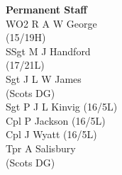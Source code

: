 \begin{multicols}{4}
  \textbf{Permanent Staff} \\
  WO2 R A W George \\ \indent (15/19H) \\
  SSgt M J Handford \\ \indent (17/21L) \\
  Sgt J L W James \\ \indent (Scots DG) \\
  Sgt P J L Kinvig (16/5L) \\
  Cpl P Jackson (16/5L) \\
  Cpl J Wyatt (16/5L) \\
  Tpr A Salisbury \\ \indent (Scots DG)
\end{multicols}

\pagebreak
